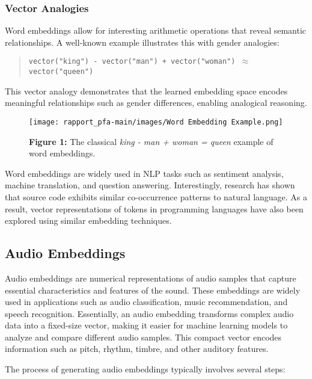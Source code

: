 \subsubsection*{Vector Analogies}

Word embeddings allow for interesting arithmetic operations that reveal semantic relationships. A well-known example illustrates this with gender analogies:

\begin{quote}
\centering
\texttt{vector("king") - vector("man") + vector("woman") $\approx$ vector("queen")}
\end{quote}

This vector analogy demonstrates that the learned embedding space encodes meaningful relationships such as gender differences, enabling analogical reasoning.

\begin{figure}[htbp]
  \centering
  \texttt{[image: rapport\_pfa-main/images/Word Embedding Example.png]}
  \caption*{\textbf{Figure 1:} The classical \textit{king - man + woman = queen} example of word embeddings.} %
  \label{fig:indexing-process-manual}
\end{figure}

Word embeddings are widely used in NLP tasks such as sentiment analysis, machine translation, and question answering. Interestingly, research has shown that source code exhibits similar co-occurrence patterns to natural language. As a result, vector representations of tokens in programming languages have also been explored using similar embedding techniques.

\subsection*{Audio Embeddings}
\label{sssec:audio-embeddings}

Audio embeddings are numerical representations of audio samples that capture essential characteristics and features of the sound. These embeddings are widely used in applications such as audio classification, music recommendation, and speech recognition. Essentially, an audio embedding transforms complex audio data into a fixed-size vector, making it easier for machine learning models to analyze and compare different audio samples. This compact vector encodes information such as pitch, rhythm, timbre, and other auditory features.

The process of generating audio embeddings typically involves several steps:

